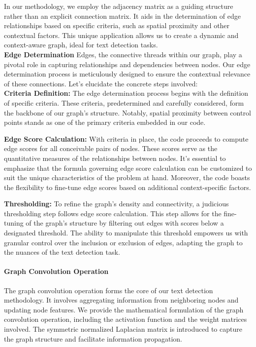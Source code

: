 In our methodology, we employ the adjacency matrix as a guiding structure rather than an explicit connection matrix. It aids in the determination of edge relationships based on specific criteria, such as spatial proximity and other contextual factors. This unique application allows us to create a dynamic and context-aware graph, ideal for text detection tasks. \\

\textbf{Edge Determination} \hfill \break
Edges, the connective threads within our graph, play a pivotal role in capturing relationships and dependencies between nodes. Our edge determination process is meticulously designed to ensure the contextual relevance of these connections. Let's elucidate the concrete steps involved: \\

\textbf{Criteria Definition:} The edge determination process begins with the definition of specific criteria. These criteria, predetermined and carefully considered, form the backbone of our graph's structure. Notably, spatial proximity between control points stands as one of the primary criteria embedded in our code.

\textbf{Edge Score Calculation:} With criteria in place, the code proceeds to compute edge scores for all conceivable pairs of nodes. These scores serve as the quantitative measures of the relationships between nodes. It's essential to emphasize that the formula governing edge score calculation can be customized to suit the unique characteristics of the problem at hand. Moreover, the code boasts the flexibility to fine-tune edge scores based on additional context-specific factors.

\textbf{Thresholding:} To refine the graph's density and connectivity, a judicious thresholding step follows edge score calculation. This step allows for the fine-tuning of the graph's structure by filtering out edges with scores below a designated threshold. The ability to manipulate this threshold empowers us with granular control over the inclusion or exclusion of edges, adapting the graph to the nuances of the text detection task.

\paragraph{Graph Convolution Operation}\hfill \break 
The graph convolution operation forms the core of our text detection methodology. It involves aggregating information from neighboring nodes and updating node features. We provide the mathematical formulation of the graph convolution operation, including the activation function and the weight matrices involved. The symmetric normalized Laplacian matrix is introduced to capture the graph structure and facilitate information propagation.

